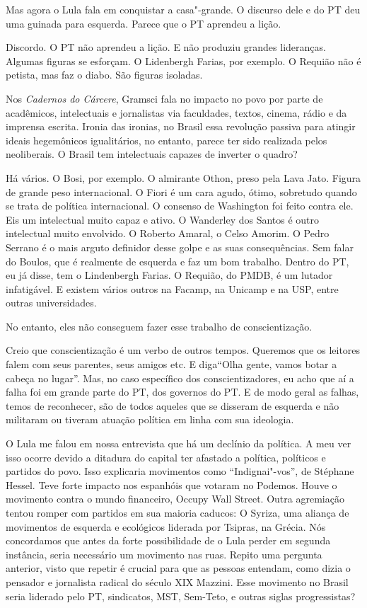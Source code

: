 \falaG Mas agora o Lula fala em conquistar a casa"-grande. O discurso dele e
do PT deu uma guinada para esquerda. Parece que o PT aprendeu a lição.

\falaM Discordo. O PT não aprendeu a lição. E não produziu grandes
lideranças. Algumas figuras se esforçam. O Lidenbergh Farias, por
exemplo. O Requião não é petista, mas faz o diabo. São figuras isoladas.

\falaG Nos \emph{Cadernos do Cárcere}, Gramsci fala no impacto no povo por
parte de acadêmicos, intelectuais e jornalistas via faculdades, textos,
cinema, rádio e da imprensa escrita. Ironia das ironias, no Brasil essa
revolução passiva para atingir ideais hegemônicos igualitários, no
entanto, parece ter sido realizada pelos neoliberais. O Brasil tem
intelectuais capazes de inverter o quadro?

\falaM Há vários. O Bosi, por exemplo. O almirante Othon, preso pela Lava
Jato. Figura de grande peso internacional. O Fiori é um cara agudo,
ótimo, sobretudo quando se trata de política internacional. O consenso
de Washington foi feito contra ele. Eis um intelectual muito capaz e
ativo. O Wanderley dos Santos é outro intelectual muito envolvido. O
Roberto Amaral, o Celso Amorim. O Pedro Serrano é o mais arguto
definidor desse golpe e as suas consequências. Sem falar do Boulos, que
é realmente de esquerda e faz um bom trabalho. Dentro do PT, eu já
disse, tem o Lindenbergh Farias. O Requião, do PMDB, é um lutador
infatigável. E existem vários outros na Facamp, na Unicamp e na USP,
entre outras universidades.

\falaG No entanto, eles não conseguem fazer esse trabalho de
conscientização.

\falaM Creio que conscientização é um verbo de outros tempos. Queremos que
os leitores falem com seus parentes, seus amigos etc. E diga\falaM ``Olha
gente, vamos botar a cabeça no lugar''. Mas, no caso específico dos
conscientizadores, eu acho que aí a falha foi em grande parte do PT, dos
governos do PT. E de modo geral as falhas, temos de reconhecer, são de
todos aqueles que se disseram de esquerda e não militaram ou tiveram
atuação política em linha com sua ideologia.

\falaG O Lula me falou em nossa entrevista que há um declínio da política. A
meu ver isso ocorre devido a ditadura do capital ter afastado a
política, políticos e partidos do povo. Isso explicaria movimentos como
``Indignai"-vos'', de Stéphane Hessel. Teve forte impacto nos espanhóis
que votaram no Podemos. Houve o movimento contra o mundo financeiro,
Occupy Wall Street. Outra agremiação tentou romper com partidos em sua
maioria caducos: O Syriza, uma aliança de movimentos de esquerda e
ecológicos liderada por Tsipras, na Grécia. Nós concordamos que antes da
forte possibilidade de o Lula perder em segunda instância, seria
necessário um movimento nas ruas. Repito uma pergunta anterior, visto
que repetir é crucial para que as pessoas entendam, como dizia o
pensador e jornalista radical do século XIX Mazzini. Esse movimento no
Brasil seria liderado pelo PT, sindicatos, MST, Sem-Teto, e outras
siglas progressistas?

